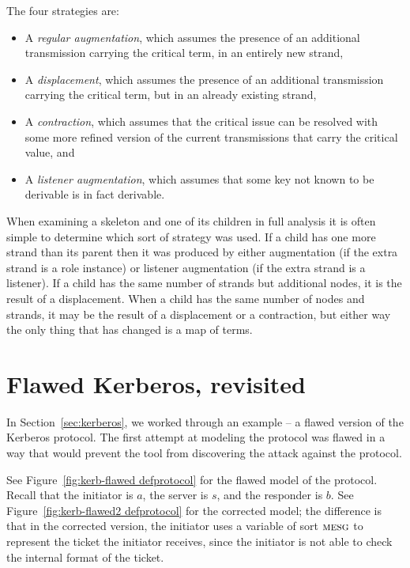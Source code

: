 The four strategies are:

\begin{itemize}

\item A \emph{regular augmentation}, which assumes the presence of an
  additional transmission carrying the critical term, in an entirely
  new strand,

\item A \emph{displacement}, which assumes the presence of an
  additional transmission carrying the critical term, but in an
  already existing strand,

\item A \emph{contraction}, which assumes that the critical issue
  can be resolved with some more refined version of the current
  transmissions that carry the critical value, and

 
\item A \emph{listener augmentation}, which assumes that some key
  not known to be derivable is in fact derivable.

\end{itemize}

When examining a skeleton and one of its children in full {\cpsa}
analysis it is often simple to determine which sort of strategy was
used.  If a child has one more strand than its parent then it was
produced by either augmentation (if the extra strand is a role
instance) or listener augmentation (if the extra strand is a
listener).  If a child has the same number of strands but additional
nodes, it is the result of a displacement.  When a child has the same
number of nodes and strands, it may be the result of a displacement or
a contraction, but either way the only thing that has changed is a
map of terms.

\section{Flawed Kerberos, revisited}
\label{sec:kerberos2}
In Section~\ref{sec:kerberos}, we worked through an example -- a
flawed version of the Kerberos protocol.  The first attempt at
modeling the protocol was flawed in a way that would prevent the tool
from discovering the attack against the protocol.

See Figure~\ref{fig:kerb-flawed defprotocol} for the flawed model of
the protocol.  Recall that the initiator is $a$, the server is $s$,
and the responder is $b$.  See Figure~\ref{fig:kerb-flawed2
  defprotocol} for the corrected model; the difference is that in the
corrected version, the initiator uses a variable of sort $\scap{mesg}$
to represent the ticket the initiator receives, since the initiator is not
able to check the internal format of the ticket.

